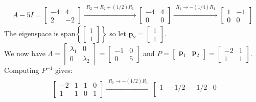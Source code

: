\documentclass{article}
\begin{document}
\begin{itemize}
\begin{align*}
A - 5I = 
\begin{bmatrix} 
-4 & 4 \\ 
2 & -2 
\end{bmatrix} 
\xrightarrow{\begin{array}{c} R_2 \rightarrow R_2 + (1/2)R_1 \end{array}} 
\begin{bmatrix} 
-4 & 4 \\ 
0 & 0 
\end{bmatrix} 
\xrightarrow{\begin{array}{c} R_1 \rightarrow -(1/4)R_1 \end{array}} 
\begin{bmatrix} 
1 & -1 \\ 
0 & 0 
\end{bmatrix} 
\end{align*} 
The eigenspace is \(\text{span}\left\{\begin{bmatrix} 1 \\ 1 \end{bmatrix}\right\}\) so let \(\mathbf{p}_2 = \begin{bmatrix} 1 \\ 1 \end{bmatrix}\). \\
We now have \(\Lambda = \begin{bmatrix} \lambda_1 & 0 \\ 0 & \lambda_2 \end{bmatrix} = \begin{bmatrix} -1 & 0 \\ 0 & 5 \end{bmatrix}\) and \(P = \begin{bmatrix} \mathbf{p}_1 & \mathbf{p}_2 \end{bmatrix} = \begin{bmatrix} -2 & 1 \\ 1 & 1 \end{bmatrix}\). Computing \(P^{-1}\) gives:
\begin{align*}
& \left[\begin{array}{cc|cc}  
-2 & 1 & 1 & 0 \\ 
 1 & 1 & 0 & 1 
\end{array}\right] 
\xrightarrow{\begin{array}{c} R_1 \rightarrow -(1/2)R_1 \end{array}} 
\left[\begin{array}{cc|cc}  
1 & -1/2 & -1/2 & 0 \\ 

\end{array}
\end{align*}
\end{itemize}
\end{document}
